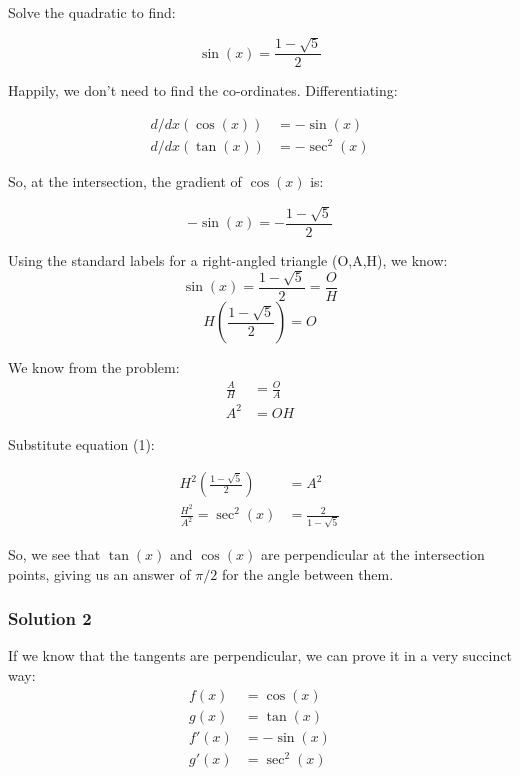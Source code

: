 \documentclass{book}
\begin{document}
Solve the quadratic to find:

\begin{equation*}
\sin(x)=\frac{1-\sqrt{5}}{2}
\end{equation*}

Happily, we don't need to find the co-ordinates. Differentiating:

\begin{align*}
d/dx(\cos(x))&=-\sin(x)\\
d/dx(\tan(x))&=-\sec^2(x)
\end{align*}

So, at the intersection, the gradient of \(\cos(x)\) is:

\begin{equation*}
-\sin(x)=-\frac{1-\sqrt{5}}{2}
\end{equation*}

Using the standard labels for a right-angled triangle (O,A,H), we know:
\begin{equation*}
\sin(x)=\frac{1-\sqrt{5}}{2}=\frac{O}{H}
\end{equation*}
\begin{equation}
H(\frac{1-\sqrt{5}}{2})=O
\end{equation}

We know from the problem:
\begin{align*}
  \frac{A}{H}&=\frac{O}{A}\\
  A^2&=OH
\end{align*}

Substitute equation (1):

\begin{align*}
  H^2(\frac{1-\sqrt{5}}{2})&=A^2\\
  \frac{H^2}{A^2}=\sec^2(x)&=\frac{2}{1-\sqrt{5}}
\end{align*}

So, we see that \(\tan(x)\) and \(\cos(x)\) are perpendicular at the intersection points, giving us an answer of \(\pi/2\) for the angle between them.
\subsubsection{Solution 2}
If we know that the tangents are perpendicular, we can prove it in a very succinct way:
\begin{align*}
  f(x)&=\cos(x)\\
  g(x)&=\tan(x)\\
  f'(x)&=-\sin(x)\\
  g'(x)&=\sec^2(x)
\end{align*}
\end{document}
